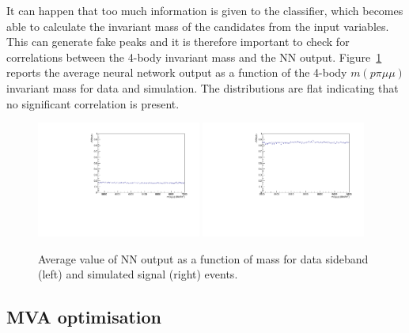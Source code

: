 It can happen that too much information is given to the classifier, which becomes able to 
calculate the invariant mass of the candidates from the input variables.
This can generate fake peaks and it is therefore important to check
for correlations between the 4-body invariant mass and the NN output.
Figure~\ref{fig:Lb_NNprofiles} reports the average neural network output as a function of
the 4-body $m(p\pi\mu\mu)$ invariant mass for data and simulation. The distributions
are flat indicating that no significant correlation is present.
%
\begin{figure}
\centering
\includegraphics[width=0.48\textwidth]{Lmumu/figs/NNout_profile_vs_LbMM_bkgData.pdf}
\includegraphics[width=0.48\textwidth]{Lmumu/figs/NNout_profile_vs_LbMM_MCsignal.pdf}
\caption{Average value of NN output as a function of \Lb mass for data sideband (left) and simulated signal (right) events.}
\label{fig:Lb_NNprofiles}
\end{figure}








\subsection{MVA optimisation}
\label{sec:Lb_mva_opt}


